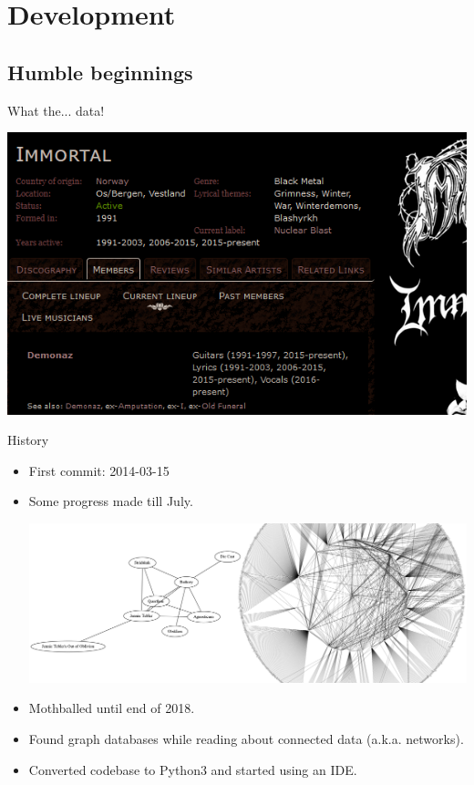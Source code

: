 \documentclass{beamer}
\begin{document}
\section{Development}

  \subsection{Humble beginnings}

    \begin{frame}{What the... data!}
    
      \begin{center}
        \includegraphics[scale=2.1]{MA_Immortal}
      \end{center}
    
    \end{frame}

    \begin{frame}{History}

      \begin{itemize}

        \item<1-> First commit: 2014-03-15
        \item<1-> Some progress made till July.
          \begin{center}
            \includegraphics[scale=.6]{bandsGraphCombined}
          \end{center}
        \item<2-> Mothballed until end of 2018.
        \item<2-> Found graph databases while reading about connected data
          (a.k.a. networks).
        \item<2-> Converted codebase to Python3 and started using an IDE.
      \end{itemize}

    \end{frame}
    
\end{document}
